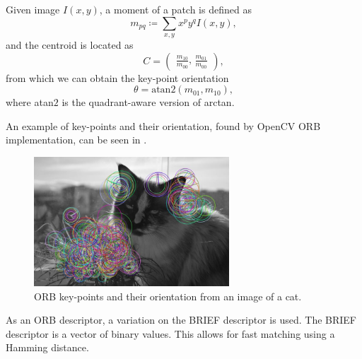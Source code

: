 Given image $I(x,y)$, a moment of a patch is defined as
\begin{equation}
    m_{pq}\coloneqq\sum_{x,y} x^p y^q I(x,y),
\end{equation}
and the centroid is located as
\begin{equation}
    C =
    \begin{pmatrix}
        \frac{m_{10}}{m_{00}} \text{, } \frac{m_{01}}{m_{00}}
    \end{pmatrix},
\end{equation}
from which we can obtain the key-point orientation
\begin{equation}
    \theta = \text{atan}2(m_{01},m_{10}),
\end{equation}
where atan$2$ is the quadrant-aware version of arctan.

An example of key-points and their orientation, found by OpenCV ORB implementation, can be seen in .
\begin{figure}[ht!]
    \centering
    \includegraphics[width=0.65\textwidth]{Figures/orb/orb_example.jpg}
    \caption[ORB key-points and their orientation from an image of a cat]{ORB key-points and their orientation from an image of a cat.}
    \label{fig:orb_example}
\end{figure}

As an ORB descriptor, a variation on the BRIEF descriptor is used. The BRIEF descriptor is a vector of binary values. This allows for fast matching using a Hamming distance.

